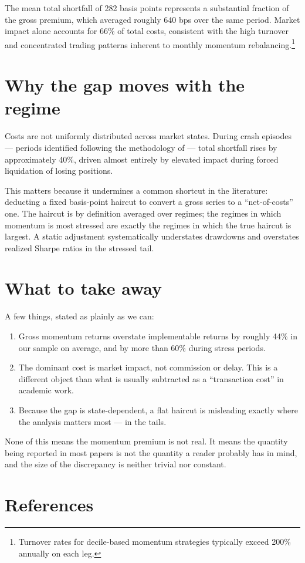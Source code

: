 \documentclass{scc}
\begin{document}
The mean total shortfall of 282 basis points represents a substantial fraction of the gross premium, which averaged roughly 640 bps over the same period. Market impact alone accounts for 66\% of total costs, consistent with the high turnover and concentrated trading patterns inherent to monthly momentum rebalancing.\footnote{Turnover rates for decile-based momentum strategies typically exceed 200\% annually on each leg.}

\section{Why the gap moves with the regime}

Costs are not uniformly distributed across market states. During crash episodes --- periods identified following the methodology of \citet{daniel2016} --- total shortfall rises by approximately 40\%, driven almost entirely by elevated impact during forced liquidation of losing positions.

This matters because it undermines a common shortcut in the literature: deducting a fixed basis-point haircut to convert a gross series to a ``net-of-costs'' one. The haircut is by definition averaged over regimes; the regimes in which momentum is most stressed are exactly the regimes in which the true haircut is largest. A static adjustment systematically understates drawdowns and overstates realized Sharpe ratios in the stressed tail.

\section{What to take away}

A few things, stated as plainly as we can:

\begin{enumerate}
  \item Gross momentum returns overstate implementable returns by roughly 44\% in our sample on average, and by more than 60\% during stress periods.
  \item The dominant cost is market impact, not commission or delay. This is a different object than what is usually subtracted as a ``transaction cost'' in academic work.
  \item Because the gap is state-dependent, a flat haircut is misleading exactly where the analysis matters most --- in the tails.
\end{enumerate}

None of this means the momentum premium is not real. It means the quantity being reported in most papers is not the quantity a reader probably has in mind, and the size of the discrepancy is neither trivial nor constant.

\section{References}

\end{document}
